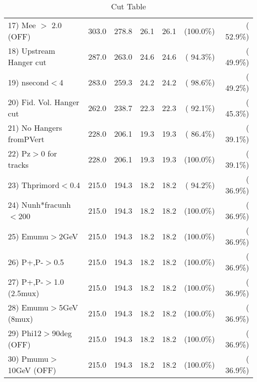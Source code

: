 \begin{table}[h!]
\begin{tabular}{||l||r|r|r|r|r|r||}
 17) Mee $>$ 2.0  (OFF)   &        303.0 &        278.8 &         26.1 &         26.1 & (100.0\%) & ( 52.9\%) \\
 18) Upstream Hanger cut  &        287.0 &        263.0 &         24.6 &         24.6 & ( 94.3\%) & ( 49.9\%) \\
 19) nsecond$<$4          &        283.0 &        259.3 &         24.2 &         24.2 & ( 98.6\%) & ( 49.2\%) \\
 20) Fid. Vol. Hanger cut &        262.0 &        238.7 &         22.3 &         22.3 & ( 92.1\%) & ( 45.3\%) \\
 21) No Hangers fromPVert &        228.0 &        206.1 &         19.3 &         19.3 & ( 86.4\%) & ( 39.1\%) \\
 22) Pz$>$0 for tracks    &        228.0 &        206.1 &         19.3 &         19.3 & (100.0\%) & ( 39.1\%) \\
 23) Thprimord$<$0.4      &        215.0 &        194.3 &         18.2 &         18.2 & ( 94.2\%) & ( 36.9\%) \\
 24) Nunh*fracunh$<$200   &        215.0 &        194.3 &         18.2 &         18.2 & (100.0\%) & ( 36.9\%) \\
 25) Emumu$>$2GeV         &        215.0 &        194.3 &         18.2 &         18.2 & (100.0\%) & ( 36.9\%) \\
 26) P+,P-$>$0.5          &        215.0 &        194.3 &         18.2 &         18.2 & (100.0\%) & ( 36.9\%) \\
 27) P+,P-$>$1.0 (2.5mux) &        215.0 &        194.3 &         18.2 &         18.2 & (100.0\%) & ( 36.9\%) \\
 28) Emumu$>$5GeV  (8mux) &        215.0 &        194.3 &         18.2 &         18.2 & (100.0\%) & ( 36.9\%) \\
 29) Phi12$>$90deg  (OFF) &        215.0 &        194.3 &         18.2 &         18.2 & (100.0\%) & ( 36.9\%) \\
 30) Pmumu$>$10GeV  (OFF) &        215.0 &        194.3 &         18.2 &         18.2 & (100.0\%) & ( 36.9\%) \\
 \hline
 \hline
 \end{tabular}
 \caption{Cut Table           }
 \label{tab-cutcohjpsi-mumu_anumucc}
 \end{table}
